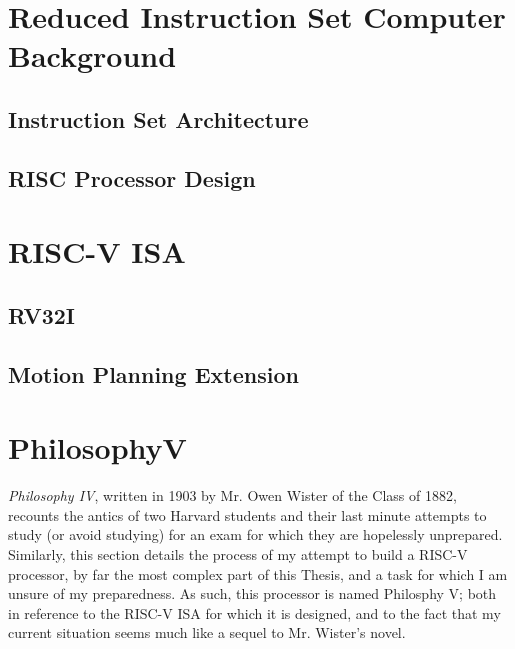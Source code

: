 
\section{Reduced Instruction Set Computer Background}
    
    \subsection{Instruction Set Architecture}

    \subsection{RISC Processor Design}

\section{RISC-V ISA}
    \subsection{RV32I}

    \subsection{Motion Planning Extension}

\section{PhilosophyV}
    \textit{Philosophy IV}, written in 1903 by Mr. Owen Wister of the Class of 1882, recounts the antics of two Harvard students and their last minute attempts to study (or avoid studying) for an exam for which they are hopelessly unprepared. Similarly, this section details the process of my attempt to build a RISC-V processor, by far the most complex part of this Thesis, and a task for which I am unsure of my preparedness. As such, this processor is named Philosphy V; both in reference to the RISC-V ISA for which it is designed, and to the fact that my current situation seems much like a sequel to Mr. Wister's novel.

